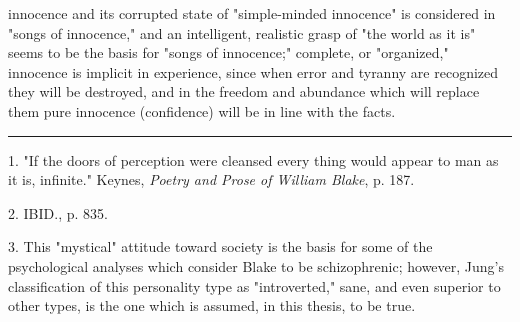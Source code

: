innocence and its corrupted state of "simple-minded innocence" is considered in "songs of innocence," and an intelligent, realistic grasp of "the world
as it is" seems to be the basis for "songs of innocence;" complete, or "organized," innocence is implicit in experience,
since when error and tyranny are recognized they will be destroyed, and in the freedom and abundance which will replace them pure innocence
(confidence) will be in line with the facts.\linebreak
\null\par
\vspace*{-\baselineskip}
\vspace*{\fill}
\noindent\rule{0.25\textwidth}{0.4pt}\par
1. "If the doors of perception were cleansed every thing would appear to man as it is, infinite." Keynes, \textit{Poetry and Prose of William Blake}, p. 187.\par
2. IBID., p. 835.\par
3. This "mystical" attitude toward society is the basis for some of the psychological analyses which consider Blake to be schizophrenic; however,
Jung's classification of this personality type as "introverted," sane, and even superior to other types, is the one which is assumed, in this thesis, to
be true.\par

\newpage


